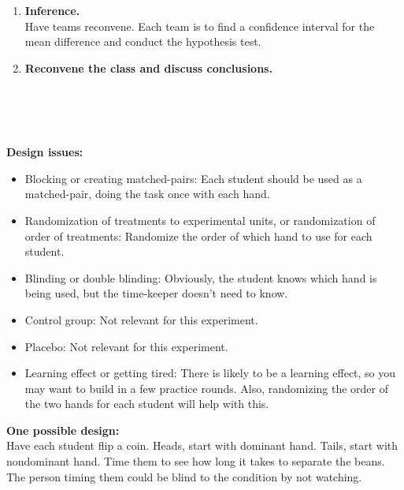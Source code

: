 \documentclass[twoside,openany]{tufte-book}
\begin{document}
\begin{enumerate}[leftmargin=*, itemsep=.2em]
\item \textbf{Inference.}\\
Have teams reconvene. Each team is to find a confidence interval for the mean difference and conduct the hypothesis test.

\item \textbf{Reconvene the class and discuss conclusions.}\\
\end{enumerate}
\vspace{12pt}

\noindent{}\\ \noindent{} \\ \noindent{}\\
\vspace{5pt}

\noindent\textbf{Design issues:}
\renewcommand{\labelitemi}{$\closedsucc$}
\begin{itemize}  [leftmargin=1cm, itemsep=.2em]
\item Blocking or creating matched-pairs: Each student should be used as a matched-pair, doing the task once with each hand.
\item Randomization of treatments to experimental units, or randomization of order of treatments: Randomize the order of which hand to use for each student.
\item Blinding or double blinding: Obviously, the student knows which hand is being used, but the time-keeper doesn't need to know.
\item Control group: Not relevant for this experiment.
\item Placebo: Not relevant for this experiment.
\item Learning effect or getting tired: There is likely to be a learning effect, so you may want to build in a few practice rounds. Also, randomizing the order of the two hands for each student will help with this. \\
\end{itemize}

\noindent \textbf{One possible design:} \\
Have each student flip a coin. Heads, start with dominant hand. Tails, start with nondominant hand. Time them to see how long it takes to separate the beans. The person timing them could be blind to the condition by not watching. \\
\end{document}

